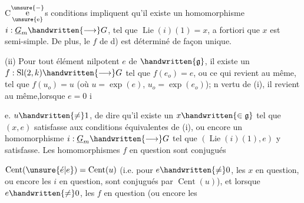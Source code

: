 C$\overset{\unsure{-}}{\underset{\text{\unsure{e}}}{\text{e}}}$s conditions impliquent qu'il existe un homomorphisme $i:\underline{G}_m\handwritten{\longrightarrow}G$, tel que $\operatorname{Lie}(i)(1)=x$, a fortiori que $x$ est semi-simple. De plus, le $f$ de d) est déterminé de façon unique.

(ii) Pour tout élément nilpotent $e$ de $\handwritten{\mathfrak{g}}$, il existe un  $f:\operatorname{Sl}(2,k)\handwritten{\longrightarrow}G$ tel que $f(e_o)=e$, ou ce qui revient au même, tel que $f(u_o)=u$ (où $u=\exp(e)$, $u_o=\exp(e_o)$); n vertu de (i), il revient au même,\deleted{\unsure{(}}lorsque $e=0$ ie. $u\handwritten{\ne}1$, de dire qu'il existe un $x\handwritten{\in\mathfrak{g}}$ tel que $(x,e)$ satisfasse aux conditions équivalentes de (i), ou encore un homomorphisme $i:\underline{G}_m\handwritten{\longrightarrow}G$ tel que $(\operatorname{Lie}(i)(1),e)$ y satisfasse. Les homomorphismes $f$ en question sont conjugués
$\operatorname{Cent}(\unsure{\acute e|e})=\operatorname{Cent}(u)$ (i.e. pour $e\handwritten{\ne}0$, les $x$ en question, ou encore les $i$ en question, sont conjugués  par $\operatorname{Cent}(u)$), et lorsque $e\handwritten{\ne}0$, les  $f$ en question (ou encore les
